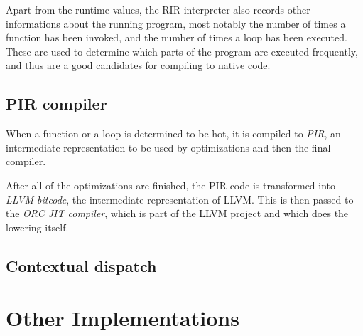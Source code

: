 Apart from the runtime values, the RIR interpreter also records other informations about the running program, most notably the number of times a function has been invoked, and the number of times a loop has been executed. These are used to determine which parts of the program are executed frequently, and thus are a good candidates for compiling to native code.

\subsection{PIR compiler}
When a function or a loop is determined to be hot, it is compiled to \textit{PIR}, an intermediate representation to be used by optimizations and then the final compiler.

After all of the optimizations are finished, the PIR code is transformed into \textit{LLVM bitcode}, the intermediate representation of LLVM. This is then passed to the \textit{ORC JIT compiler}, which is part of the LLVM project and which does the lowering itself.

\subsection{Contextual dispatch}

\section{Other Implementations}
